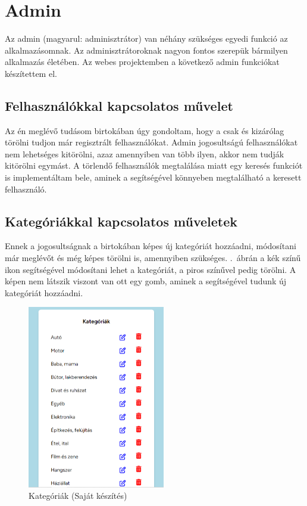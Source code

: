 \documentclass[]{thesis-ekf}
\theoremstyle{definition}
\theoremstyle{remark}
\begin{document}
	\section{Admin}
		Az admin (magyarul: adminisztrátor) van néhány szükséges egyedi funkció az alkalmazásomnak. Az adminisztrátoroknak nagyon fontos szerepük bármilyen alkalmazás életében. Az webes projektemben a következő admin funkciókat készítettem el.
	\subsection{Felhasználókkal kapcsolatos művelet}
		Az én meglévő tudásom birtokában úgy gondoltam, hogy a csak és kizárólag törölni tudjon már regisztrált felhasználókat. Admin jogosultságú felhasználókat nem lehetséges kitörölni, azaz amennyiben van több ilyen, akkor nem tudják kitörölni egymást. A törlendő felhasználók megtalálása miatt egy keresés funkciót is implementáltam bele, aminek a segítségével könnyeben megtalálható a keresett felhasználó.
	\subsection{Kategóriákkal kapcsolatos műveletek}\label{sc-kategoria}
		Ennek a jogosultságnak a birtokában képes új kategóriát hozzáadni, módosítani már meglévőt és még képes törölni is, amennyiben szükséges. .~ábrán a kék színű ikon segítségével módosítani lehet a kategóriát, a piros színűvel pedig törölni. A képen nem látszik viszont van ott egy gomb, aminek a segítségével tudunk új kategóriát hozzáadni.
		\begin{figure}[ht!]
			\centering
			\includegraphics[height=8cm]{./felhasznaloi/kategoria}
			\caption{Kategóriák (Saját készítés)} 
			\label{kategoria-muveletek}
		\end{figure} 
\end{document}
